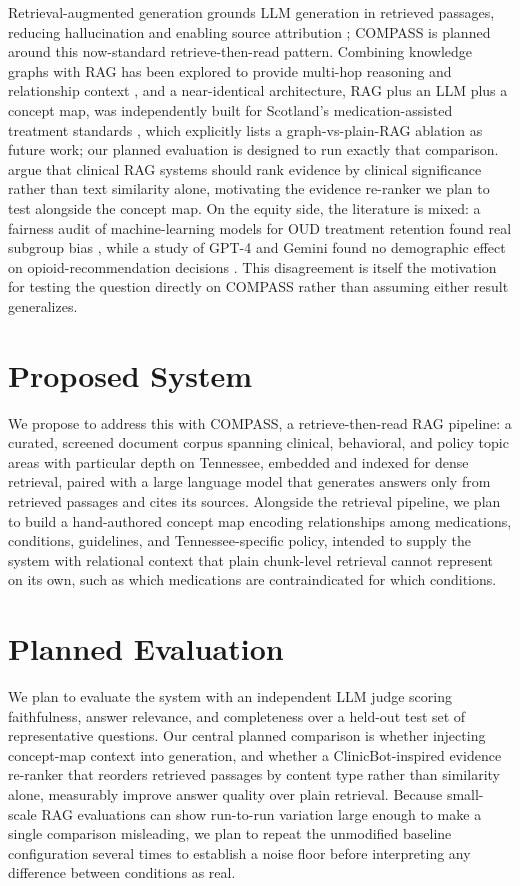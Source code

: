 \documentclass[letterpaper]{article}
\begin{document}
Retrieval-augmented generation grounds LLM generation in retrieved passages, reducing hallucination and enabling source attribution \citep{lewis2020rag}; COMPASS is planned around this now-standard retrieve-then-read pattern. Combining knowledge graphs with RAG has been explored to provide multi-hop reasoning and relationship context \citep{edge2024graphrag}, and a near-identical architecture, RAG plus an LLM plus a concept map, was independently built for Scotland's medication-assisted treatment standards \citep{scotlandmat2026}, which explicitly lists a graph-vs-plain-RAG ablation as future work; our planned evaluation is designed to run exactly that comparison. \citet{clinicbot2026} argue that clinical RAG systems should rank evidence by clinical significance rather than text similarity alone, motivating the evidence re-ranker we plan to test alongside the concept map. On the equity side, the literature is mixed: a fairness audit of machine-learning models for OUD treatment retention found real subgroup bias \citep{wang2026fairness}, while a study of GPT-4 and Gemini found no demographic effect on opioid-recommendation decisions \citep{young2024}. This disagreement is itself the motivation for testing the question directly on COMPASS rather than assuming either result generalizes.

\section{Proposed System}

We propose to address this with COMPASS, a retrieve-then-read RAG pipeline: a curated, screened document corpus spanning clinical, behavioral, and policy topic areas with particular depth on Tennessee, embedded and indexed for dense retrieval, paired with a large language model that generates answers only from retrieved passages and cites its sources. Alongside the retrieval pipeline, we plan to build a hand-authored concept map encoding relationships among medications, conditions, guidelines, and Tennessee-specific policy, intended to supply the system with relational context that plain chunk-level retrieval cannot represent on its own, such as which medications are contraindicated for which conditions.

\section{Planned Evaluation}

We plan to evaluate the system with an independent LLM judge scoring faithfulness, answer relevance, and completeness over a held-out test set of representative questions. Our central planned comparison is whether injecting concept-map context into generation, and whether a ClinicBot-inspired evidence re-ranker \citep{clinicbot2026} that reorders retrieved passages by content type rather than similarity alone, measurably improve answer quality over plain retrieval. Because small-scale RAG evaluations can show run-to-run variation large enough to make a single comparison misleading, we plan to repeat the unmodified baseline configuration several times to establish a noise floor before interpreting any difference between conditions as real.
\end{document}

